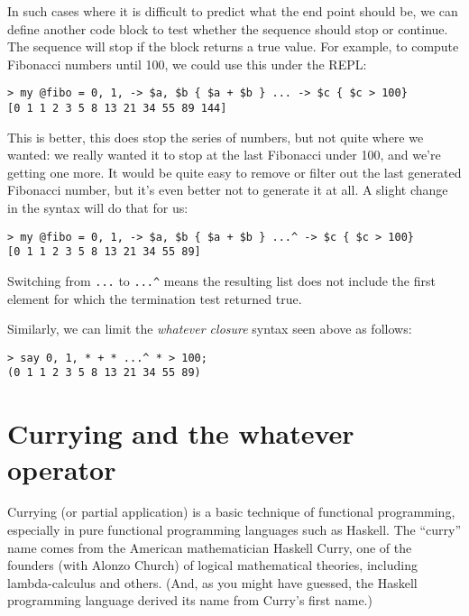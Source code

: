 In such cases where it is difficult to predict what the end 
point should be, we can define another code block to test 
whether the sequence should stop or continue. The sequence 
will stop if the block returns a true value. For example, 
to compute Fibonacci numbers until 100, we could use this 
under the REPL:

\begin{verbatim}
> my @fibo = 0, 1, -> $a, $b { $a + $b } ... -> $c { $c > 100}
[0 1 1 2 3 5 8 13 21 34 55 89 144]
\end{verbatim}

This is better, this does stop the series of numbers, but not 
quite where we wanted: we really wanted it to stop at the last 
Fibonacci under 100, and we're getting one more. It would be 
quite easy to remove or filter out the last generated Fibonacci 
number, but it's even better not to generate it at all. A slight 
change in the syntax will do that for us:

\begin{verbatim}
> my @fibo = 0, 1, -> $a, $b { $a + $b } ...^ -> $c { $c > 100}
[0 1 1 2 3 5 8 13 21 34 55 89]
\end{verbatim}

Switching from \verb'...' to \verb'...^' means the 
resulting list does not include the first element 
for which the termination test returned true.

Similarly, we can limit the \emph{whatever closure} 
syntax seen above as follows:

\begin{verbatim}
> say 0, 1, * + * ...^ * > 100;
(0 1 1 2 3 5 8 13 21 34 55 89)
\end{verbatim}

\section{Currying and the whatever operator}

Currying (or partial application) is a basic technique 
of functional programming, especially in pure functional 
programming languages such as Haskell. The ``curry'' name comes 
from the American mathematician Haskell Curry, one of the 
founders (with Alonzo Church) of logical mathematical 
theories, including lambda-calculus and others. (And, as 
you might have guessed, the Haskell programming language 
derived its name from Curry's first name.)


